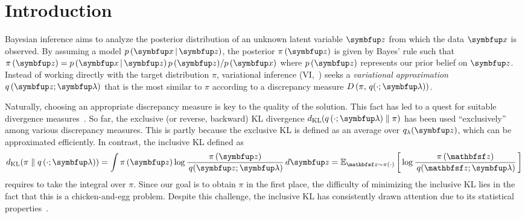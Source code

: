 
\section{Introduction}\label{section:intro}
Bayesian inference aims to analyze the posterior distribution of an unknown latent variable \(\vz\) from which the data \(\vx\) is observed.
%
%
By assuming a model \(p\,(\vx\,|\,\vz)\), the posterior \(\pi\,(\vz)\) is given by Bayes' rule such that \(\pi\,(\vz) = {p\,(\vx\,|\,\vz)\,p\,(\vz)}/{p\,(\vx)}\) where \(p\,(\vz)\) represents our prior belief on \(\vz\).
Instead of working directly with the target distribution \(\pi\), variational inference (VI,~\citealt{blei_variational_2017}) seeks a \textit{variational approximation} \(q\,(\vz; \vlambda)\) that is the most similar to \(\pi\) according to a discrepancy measure \(D\,(\pi,\, q(\cdot; \vlambda))\).

Naturally, choosing an appropriate discrepancy measure is key to the quality of the solution.
This fact has led to a quest for suitable divergence measures~\citep{pmlr-v37-salimans15, NIPS2016_7750ca35, NIPS2017_35464c84, NEURIPS2018_1cd138d0, pmlr-v97-ruiz19a}.
So far, the exclusive (or reverse, backward)  KL divergence \(\DKL{q\left(\cdot; \vlambda\right)}{\pi}\) has been used ``exclusively'' among various discrepancy measures.
This is partly because the exclusive KL is defined as an average over \(q_{\lambda}(\vz)\), which can be approximated efficiently.
In contrast, the inclusive KL defined as
%
{%
\vspace{-0.05in}
\begin{align*}
  \DKL{\pi}{q\left(\cdot; \vlambda\right)}
  = \int \pi\,(\vz) \log \frac{\pi\left(\vz\right)}{\,q(\vz; \vlambda)} \,d\vz
  = \Esub{\rvvz \sim \pi\left(\cdot\right)}{\log \frac{\pi\left(\rvvz\right)}{\,q(\rvvz; \vlambda)} } %
\end{align*}
}%
%
requires to take the integral over \(\pi\).
Since our goal is to obtain \(\pi\) in the first place, the difficulty of minimizing the inclusive KL lies in the fact that this is a chicken-and-egg problem.
Despite this challenge, the inclusive KL has consistently drawn attention due to its statistical properties~\citep{minka2005divergence, mackay_local_2001}.

